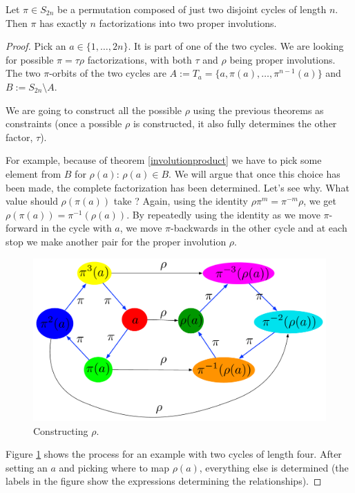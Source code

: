 \begin{thm}\label{involutionproduct5}
Let $\pi \in S_{2n}$ be a permutation composed of just two disjoint cycles of length $n$. Then $\pi$ has exactly $n$ factorizations into two proper involutions.
\end{thm}

\begin{proof}

Pick an $a \in \{1, \ldots, 2n\}$. It is part of one of the two cycles. We are looking for possible $\pi = \tau \rho$ factorizations, with both $\tau$ and $\rho$ being proper involutions.
The two $\pi$-orbits of the two cycles are $A := T_a = \{a, \pi(a), \ldots, \pi^{n-1}(a)\}$ and $B := S_{2n} \setminus A$.

We are going to construct all the possible $\rho$ using the previous theorems as constraints (once a possible $\rho$ is constructed, it also fully determines the other factor, $\tau$). 

For example, because of theorem \ref{involutionproduct} we have to pick some element from $B$ for $\rho(a)$: $\rho(a) \in B$. We will argue that once this choice has been made, the complete factorization has been determined. Let's see why. What value should $\rho(\pi(a))$ take ? Again, using the identity $\rho \pi^m = \pi^{-m} \rho$, we get $\rho(\pi(a)) = \pi^{-1}(\rho(a))$. By repeatedly using the identity as we move $\pi$-forward in the cycle with $a$, we move $\pi$-backwards in the other cycle and at each stop we make another pair for the proper involution $\rho$. 

\begin{figure}
\includegraphics[scale=0.35]{enigma1.pdf}
\caption{Constructing $\rho$.}
\label{rhoconstructionexample}
\end{figure}

Figure \ref{rhoconstructionexample} shows the process for an example with two cycles of length four. After setting an $a$ and picking where to map $\rho(a)$, everything else is determined (the labels in the figure show the expressions determining the relationships).


\end{proof}
